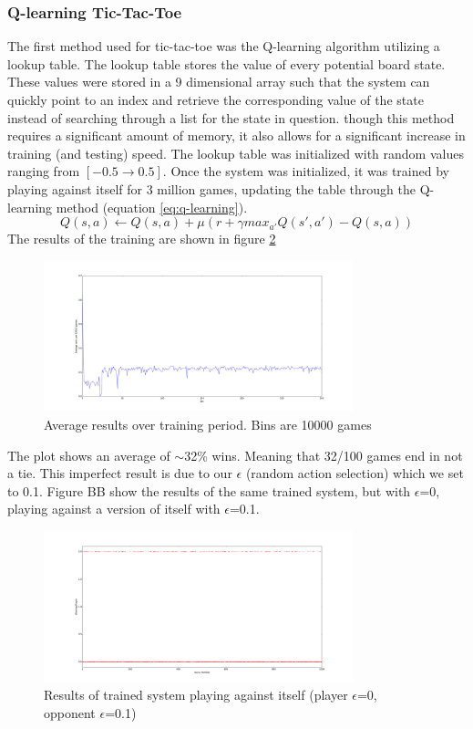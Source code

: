 \documentclass[12pt,a4paper]{article}
\begin{document}
\subsubsection*{Q-learning Tic-Tac-Toe}
The first method used for tic-tac-toe was the Q-learning algorithm utilizing a lookup table. The lookup table stores the value of every potential board state. These values were stored in a 9 dimensional array such that the system can quickly point to an index and retrieve the corresponding value of the state instead of searching through a list for the state in question. though this method requires a significant amount of memory, it also allows for a significant increase in training (and testing) speed. The lookup table was initialized with random values ranging from $[-0.5 \rightarrow 0.5]$. Once the system was initialized, it was trained by playing against itself for 3 million games, updating the table through the Q-learning method (equation \ref{eq:q-learning}). 
\begin{equation}
{Q(s,a)} \leftarrow {Q(s,a) + \mu(r + \gamma max_{a'}Q(s',a')-Q(s,a))}
\label{eq:q-learning}
\end{equation}
The results of the training are shown in figure \ref{fig:training}
\begin{figure}[H]
\centering
\includegraphics[width=0.8\textwidth]{figures/train01epsilon.png}
\caption{Average results over training period. Bins are 10000 games}
\label{fig:training}
\end{figure}
The plot shows an average of $\sim$32\% wins. Meaning that 32/100 games end in not a tie. This imperfect result is due to our $\epsilon$ (random action selection) which we set to 0.1. Figure BB show the results of the same trained system, but with $\epsilon$=0, playing against a version of itself with $\epsilon$=0.1.
\begin{figure}[H]
\centering
\includegraphics[width=0.8\textwidth]{figures/Optimalstateresults.png}
\caption{Results of trained system playing against itself (player $\epsilon$=0, opponent $\epsilon$=0.1)}
\label{fig:training}
\end{figure}
\end{document}
